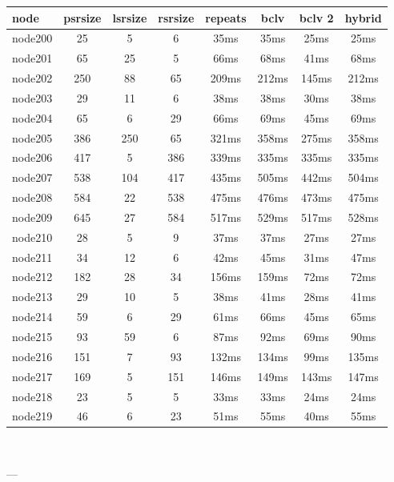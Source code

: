 \begin{tabular}{|l|c|c|c|c|c|c|c|}
\hline node & psrsize & lsrsize & rsrsize   & repeats & bclv & bclv 2 & hybrid\\
    \hline node200 & 25 & 5 & 6 & 35ms & 35ms & 25ms & 25ms\\
    \hline node201 & 65 & 25 & 5 & 66ms & 68ms & 41ms & 68ms\\
    \hline node202 & 250 & 88 & 65 & 209ms & 212ms & 145ms & 212ms\\
    \hline node203 & 29 & 11 & 6 & 38ms & 38ms & 30ms & 38ms\\
    \hline node204 & 65 & 6 & 29 & 66ms & 69ms & 45ms & 69ms\\
    \hline node205 & 386 & 250 & 65 & 321ms & 358ms & 275ms & 358ms\\
    \hline node206 & 417 & 5 & 386 & 339ms & 335ms & 335ms & 335ms\\
    \hline node207 & 538 & 104 & 417 & 435ms & 505ms & 442ms & 504ms\\
    \hline node208 & 584 & 22 & 538 & 475ms & 476ms & 473ms & 475ms\\
    \hline node209 & 645 & 27 & 584 & 517ms & 529ms & 517ms & 528ms\\
    \hline node210 & 28 & 5 & 9 & 37ms & 37ms & 27ms & 27ms\\
    \hline node211 & 34 & 12 & 6 & 42ms & 45ms & 31ms & 47ms\\
    \hline node212 & 182 & 28 & 34 & 156ms & 159ms & 72ms & 72ms\\
    \hline node213 & 29 & 10 & 5 & 38ms & 41ms & 28ms & 41ms\\
    \hline node214 & 59 & 6 & 29 & 61ms & 66ms & 45ms & 65ms\\
    \hline node215 & 93 & 59 & 6 & 87ms & 92ms & 69ms & 90ms\\
    \hline node216 & 151 & 7 & 93 & 132ms & 134ms & 99ms & 135ms\\
    \hline node217 & 169 & 5 & 151 & 146ms & 149ms & 143ms & 147ms\\
    \hline node218 & 23 & 5 & 5 & 33ms & 33ms & 24ms & 24ms\\
    \hline node219 & 46 & 6 & 23 & 51ms & 55ms & 40ms & 55ms\\

\hline
\end{tabular} \

---


